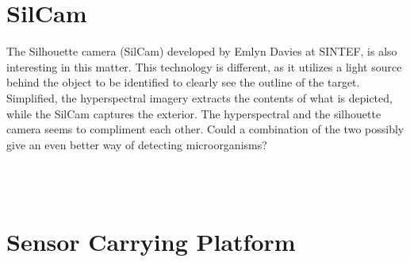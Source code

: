 \section{SilCam}
The Silhouette camera (SilCam) developed by Emlyn Davies at SINTEF, is also interesting in this matter. This technology is different, as it utilizes a light source behind the object to be identified to clearly see the outline of the target. Simplified, the hyperspectral imagery extracts the contents of what is depicted, while the SilCam captures the exterior. The hyperspectral and the silhouette camera seems to compliment each other. Could a combination of the two possibly give an even better way of detecting microorganisms?


\\\\
\section{Sensor Carrying Platform}

